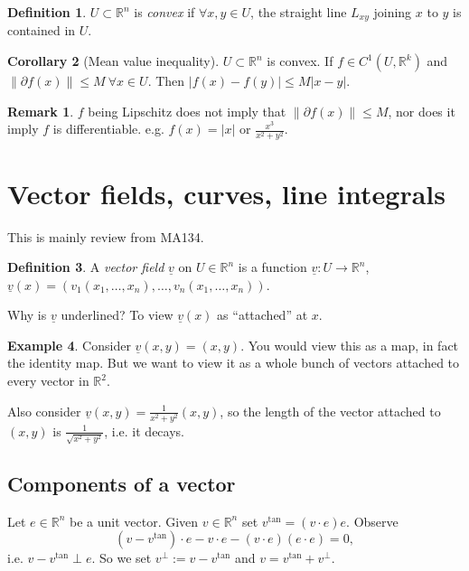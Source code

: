\documentclass[a4paper]{article}
\theoremstyle{definition}
\newtheorem{defn}{Definition}[subsection]
\newtheorem{coro}[defn]{Corollary}
\newtheorem{eg}[defn]{Example}
\newtheorem*{remark}{Remark}
\begin{document}
\begin{defn}
$U\subset \mathbb R^n$ is \textit{convex} if $\forall x,y\in U$, the straight line $L_{xy}$ joining $x$ to $y$ is contained in $U$.
\end{defn}
\begin{coro}[Mean value inequality]
$U\subset \mathbb R^n$ is convex. If $f\in C^1(U,\mathbb R^k)$ and $\|\partial f(x)\| \leq M \ \forall x\in U$. Then $|f(x)-f(y)|\leq M|x-y|$.
\end{coro}
\begin{remark}
$f$ being Lipschitz does not imply that $\|\partial f(x)\| \leq M$, nor does it imply $f$ is differentiable. e.g. $f(x)=|x|$ or $\frac{x^3}{x^2+y^2}$.
\end{remark}

\section{Vector fields, curves, line integrals}
This is mainly review from MA134.
\begin{defn}
A \textit{vector field} $\underline{v}$ on $U\in \mathbb R^n$ is a function $\underline{v}:U\rightarrow \mathbb R^n$, $\underline{v}(x)=\left(v_1(x_1,\ldots,x_n),\ldots,v_n(x_1,\ldots,x_n)\right)$.
\end{defn}
Why is $\underline{v}$ underlined? To view $\underline{v}(x)$ as ``attached'' at $x$.
\begin{eg}
Consider $\underline{v}(x,y)=(x,y).$ You would view this as a map, in fact the identity map. But we want to view it as a whole bunch of vectors attached to every vector in $\mathbb R^2$.
\begin{center}
\end{center}

Also consider $\underline{v}(x,y) = \frac{1}{x^2+y^2} (x,y)$, so the length of the vector attached to $(x,y)$ is $\frac{1}{\sqrt{x^2+y^2}}$, i.e. it decays.
\end{eg}

\subsection{Components of a vector}
Let $e\in \mathbb R^n$ be a unit vector. Given $v\in \mathbb R^n$ set $v^{\tan}= (v\cdot e) e$. Observe
\[
(v-v^{\tan})\cdot e - v\cdot e - (v\cdot e)(e\cdot e)=0,
\]
i.e. $v-v^{\tan} \perp e$. So we set $v^\perp :=v-v^{\tan}$ and $v=v^{\tan} + v^\perp$.
\end{document}
